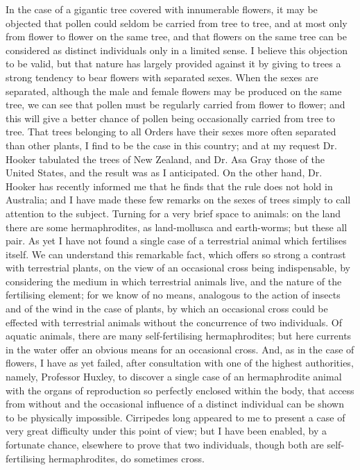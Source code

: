 In the case of a gigantic tree covered with innumerable flowers, it may be objected that pollen could seldom be carried from tree to tree, and at most only from flower to flower on the same tree, and that flowers on the same tree can be considered as distinct individuals only in a limited sense. I believe this objection to be valid, but that nature has largely provided against it by giving to trees a strong tendency to bear flowers with separated sexes. When the sexes are separated, although the male and female flowers may be produced on the same tree, we can see that pollen must be regularly carried from flower to flower; and this will give a better chance of pollen being occasionally carried from tree to tree. That trees belonging to all Orders have their sexes more often separated than other plants, I find to be the case in this country; and at my request Dr. Hooker tabulated the trees of New Zealand, and Dr. Asa Gray those of the United States, and the result was as I anticipated. On the other hand, Dr. Hooker has recently informed me that he finds that the rule does not hold in Australia; and I have made these few remarks on the sexes of trees simply to call attention to the subject.
Turning for a very brief space to animals: on the land there are some hermaphrodites, as land-mollusca and earth-worms; but these all pair. As yet I have not found a single case of a terrestrial animal which fertilises itself. We can understand this remarkable fact, which offers so strong a contrast with terrestrial plants, on the view of an occasional cross being indispensable, by considering the medium in which terrestrial animals live, and the nature of the fertilising element; for we know of no means, analogous to the action of insects and of the wind in the case of plants, by which an occasional cross could be effected with terrestrial animals without the concurrence of two individuals. Of aquatic animals, there are many self-fertilising hermaphrodites; but here currents in the water offer an obvious means for an occasional cross. And, as in the case of flowers, I have as yet failed, after consultation with one of the highest authorities, namely, Professor Huxley, to discover a single case of an hermaphrodite animal with the organs of reproduction so perfectly enclosed within the body, that access from without and the occasional influence of a distinct individual can be shown to be physically impossible. Cirripedes long appeared to me to present a case of very great difficulty under this point of view; but I have been enabled, by a fortunate chance, elsewhere to prove that two individuals, though both are self-fertilising hermaphrodites, do sometimes cross.
